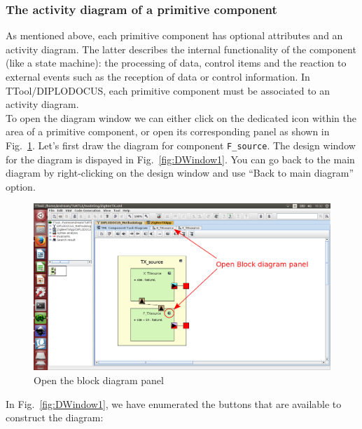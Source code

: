 \documentclass{llncs}
\newcommand{\screenshotsize}{1.0\textwidth}
\begin{document}
\subsubsection{The activity diagram of a primitive component}
%
As mentioned above, each primitive component has optional attributes and an activity diagram. The latter describes the
internal functionality of the component (like a state machine): the processing of data, control items and the reaction
to external events such as the reception of data or control information. In TTool/DIPLODOCUS, each primitive component
must be associated to an activity diagram.\\
%
To open the diagram window we can either click on the dedicated icon within the area of a primitive component, or open
its corresponding panel as shown in Fig.~\ref{fig:Ports5}. Let's first draw the diagram for component
\texttt{F\_source}. The design window for the diagram is dispayed in
Fig.~\ref{fig:DWindow1}. You can go back to the main diagram by right-clicking
on the design window and use ``Back to main diagram'' option.
%
\begin{figure}[!htbp]
	\centering
	\includegraphics[width=\screenshotsize]{figures/screenshot/Ports5.png}
	\caption{Open the block diagram panel}
	\label{fig:Ports5}
\end{figure}
%
In Fig.~\ref{fig:DWindow1}, we have enumerated the buttons that are available to construct the diagram:
%
\end{document}
